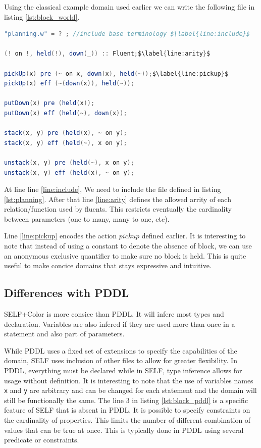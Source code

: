 \documentclass[11pt,a4paper,twoside,openright,titlepage,numbers=noenddot,headinclude,cleardoublepage=empty,openany]{scrreprt}
\theoremstyle{plain}
\theoremstyle{definition}
\theoremstyle{remark}
\newcommand{\passthrough}[1]{#1}
\begin{document}
Using the classical example domain used earlier we can write the
following file in listing \ref{lst:block_world}.

\begin{lstlisting}[language=Java, caption={Blockworld writen in SELF to work with Color}, escapechar={$}, label=lst:block_world]
"planning.w" = ? ; //include base terminology $\label{line:include}$

(! on !, held(!), down(_)) :: Fluent;$\label{line:arity}$

pickUp(x) pre (~ on x, down(x), held(~));$\label{line:pickup}$
pickUp(x) eff (~(down(x)), held(~));

putDown(x) pre (held(x));
putDown(x) eff (held(~), down(x));

stack(x, y) pre (held(x), ~ on y);
stack(x, y) eff (held(~), x on y);

unstack(x, y) pre (held(~), x on y);
unstack(x, y) eff (held(x), ~ on y);
\end{lstlisting}

At line line \ref{line:include}, We need to include the file defined in
listing \ref{lst:planning}. After that line \ref{line:arity} defines the
allowed arrity of each relation/function used by fluents. This restricts
eventually the cardinality between parameters (one to many, many to one,
etc).

Line \ref{line:pickup} encodes the action \(pickup\) defined earlier. It
is interesting to note that instead of using a constant to denote the
absence of block, we can use an anonymous exclusive quantifier to make
sure no block is held. This is quite useful to make concice domains that
stays expressive and intuitive.

\hypertarget{differences-with-pddl}{%
\subsection{Differences with PDDL}\label{differences-with-pddl}}

SELF+Color is more consice than PDDL. It will infere most types and
declaration. Variables are also infered if they are used more than once
in a statement and also part of parameters.

While PDDL uses a fixed set of extensions to specify the capabilities of
the domain, SELF uses inclusion of other files to allow for greater
flexibility. In PDDL, everything must be declared while in SELF, type
inference allows for usage without definition. It is interesting to note
that the use of variables names \passthrough{\lstinline!x!} and
\passthrough{\lstinline!y!} are arbitrary and can be changed for each
statement and the domain will still be functionally the same. The line 3
in listing \ref{lst:block_pddl} is a specific feature of SELF that is
absent in PDDL. It is possible to specify constraints on the cardinality
of properties. This limits the number of different combination of values
that can be true at once. This is typically done in PDDL using several
predicate or constraints.
\end{document}
